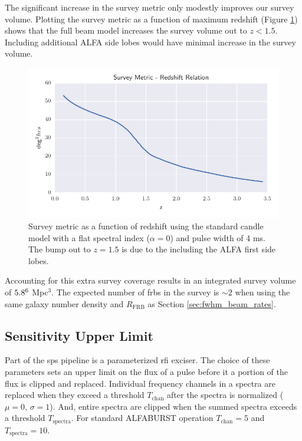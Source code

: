 \documentclass[a4paper,fleqn,usenatbib]{mnras}
\begin{document}
The significant increase in the survey metric only modestly improves our survey
volume. Plotting the survey metric as a function of maximum redshift (Figure
\ref{fig:full_sefd_z}) shows that the full beam model increases the survey
volume out to $z<1.5$. Including additional ALFA side lobes would have minimal
increase in the survey volume.

\begin{figure}
    \includegraphics[width=1.0\linewidth]{figures/full_sefd_z_relation.pdf}
    \caption{Survey metric as a function of redshift using the standard candle
    model with a flat spectral index ($\alpha=0$) and pulse width of 4 ms. The
    bump out to $z=1.5$ is due to the including the ALFA first side lobes.
    }
    \label{fig:full_sefd_z}
\end{figure}

Accounting for this extra survey coverage results in an integrated survey volume
of $5.8 \time 10^6$ Mpc$^3$. The expected number of \glspl{frb} in the survey is
$\sim 2$ when using the same galaxy number density and $R_{\textrm{FRB}}$ as
Section \ref{sec:fwhm_beam_rates}.

\subsection{Sensitivity Upper Limit}
\label{sec:upper_limit}

Part of the \gls{sps} pipeline is a parameterized \gls{rfi} exciser. The choice
of these parameters sets an upper limit on the flux of a pulse before it a
portion of the flux is clipped and replaced. Individual frequency channels in a
spectra are replaced when they exceed a threshold $T_{\textrm{chan}}$ after the
spectra is normalized ($\mu=0$, $\sigma=1$). And, entire spectra are clipped
when the summed spectra exceeds a threshold $T_{\textrm{spectra}}$. For standard
ALFABURST operation $T_{\textrm{chan}} = 5$ and $T_{\textrm{spectra}} = 10$.
\end{document}

